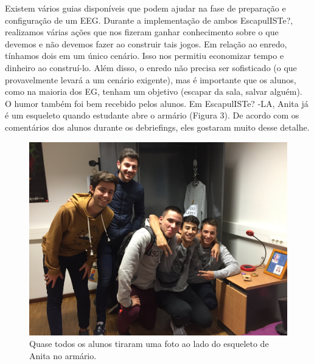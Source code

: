 Existem vários guias disponíveis \citep{ho_unlocking_2018, wiemker_escape_2015} que podem ajudar na fase de preparação e configuração de um EEG. Durante a implementação de ambos EscapulISTe?, realizamos várias ações que nos fizeram ganhar conhecimento sobre o que devemos e não devemos fazer ao construir tais jogos. Em relação ao enredo, tínhamos dois em um único cenário. Isso nos permitiu economizar tempo e dinheiro ao construí-lo. Além disso, o enredo não precisa ser sofisticado (o que provavelmente levará a um cenário exigente), mas é importante que os alunos, como na maioria dos EG, tenham um objetivo (escapar da sala, salvar alguém). O humor também foi bem recebido pelos alunos. Em EscapulISTe? -LA, Anita já é um esqueleto quando estudante abre o armário (Figura 3). De acordo com os comentários dos alunos durante os debriefings, eles gostaram muito desse detalhe.

\begin{figure}
    \centering
    \includegraphics[width=.9\textwidth]{chaps/Images/IMG_3002(1).jpeg}
    \caption{Quase todos os alunos tiraram uma foto ao lado do esqueleto de Anita no armário.}
    \label{fig:quarto_anita_esqueleto}
\end{figure}

